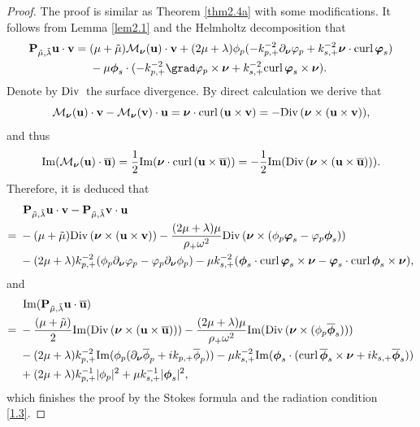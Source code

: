 \documentclass[final,reqno]{siamltex}
\newcommand{\Div}{{\rm Div\,}}
\newcommand{\om}{\omega}
\newcommand{\pa}{\partial}
\newcommand{\ov}{\overline}
\newcommand{\I}{{\rm Im}}
\newcommand{\curl}{{\rm curl\,}}
\newcommand{\ben}{\begin{eqnarray*}}
\newcommand{\enn}{\end{eqnarray*}}
\begin{document}
\begin{proof}
	The proof is similar as Theorem \ref{thm2.4a} with some modifications. It follows from Lemma \ref{lem2.1} and the Helmholtz decomposition that 
	\begin{align*}
	  \begin{aligned}
	  	\mathbf{P}_{\tilde{\mu},\tilde{\lambda}}\mathbf{u}\cdot\mathbf{v}=\;&(\mu+\tilde{\mu})\mathcal{M}_{\boldsymbol{\nu}}(\mathbf{u})\cdot\mathbf{v}+(2\mu+\lambda)\phi_p(-k_{p,+}^{-2}\pa_{\boldsymbol{\nu}}\varphi_p+k_{s,+}^{-2}\boldsymbol{\nu}\cdot\curl\boldsymbol{\varphi}_s) \\
	  &-\mu\boldsymbol{\phi}_s\cdot(-k_{p,+}^{-2}\grad\varphi_p\times\boldsymbol{\nu}+k_{s,+}^{-2}\curl\boldsymbol{\varphi}_s\times\boldsymbol{\nu}). 
	  \end{aligned}
	\end{align*}
	Denote by $\Div$ the surface divergence. By direct calculation we derive that 
	$$
	  \mathcal{M}_{\boldsymbol{\nu}}(\mathbf{u})\cdot\mathbf{v}-\mathcal{M}_{\boldsymbol{\nu}}(\mathbf{v})\cdot\mathbf{u}=\boldsymbol{\nu}\cdot\curl(\mathbf{u}\times\mathbf{v})=-\Div(\boldsymbol{\nu}\times(\mathbf{u}\times\mathbf{v})), 
	$$
	and thus 
	$$
	  \I(\mathcal{M}_{\boldsymbol{\nu}}(\mathbf{u})\cdot\mathbf{\ov u})=\frac{1}{2}\I(\boldsymbol{\nu}\cdot\curl(\mathbf{u}\times\mathbf{\ov u}))=-\frac{1}{2}\I(\Div(\boldsymbol{\nu}\times(\mathbf{u}\times\mathbf{\ov u}))). 
	$$
	Therefore, it is deduced that 
	\ben
	  \begin{aligned}
	  	&\;\mathbf{P}_{\tilde{\mu},\tilde{\lambda}}\mathbf{u}\cdot\mathbf{v}-\mathbf{P}_{\tilde{\mu},\tilde{\lambda}}\mathbf{v}\cdot\mathbf{u} \\
	  =\;&-(\mu+\tilde{\mu})\Div(\boldsymbol{\nu}\times(\mathbf{u}\times\mathbf{v}))-\frac{(2\mu+\lambda)\mu}{\rho_+\om^2}\Div(\boldsymbol{\nu}\times(\phi_p\boldsymbol{\varphi}_s-\varphi_p\boldsymbol{\phi}_s)) \\
	  &-(2\mu+\lambda)k_{p,+}^{-2}(\phi_p\pa_{\boldsymbol{\nu}}\varphi_p-\varphi_p\pa_{\boldsymbol{\nu}}\phi_p)-\mu k_{s,+}^{-2}(\boldsymbol{\phi}_s\cdot\curl\boldsymbol{\varphi}_s\times\boldsymbol{\nu}-\boldsymbol{\varphi}_s\cdot\curl\boldsymbol{\phi}_s\times\boldsymbol{\nu}), 
	  \end{aligned}
	\enn
	and 
	\ben
	  \begin{aligned}
	  	&\;\I(\mathbf{P}_{\tilde{\mu},\tilde{\lambda}}\mathbf{u}\cdot\mathbf{\ov u}) \\
	  =\;&-\frac{(\mu+\tilde{\mu})}{2}\I(\Div(\boldsymbol{\nu}\times(\mathbf{u}\times\mathbf{\ov u})))-\frac{(2\mu+\lambda)\mu}{\rho_+\om^2}\I(\Div(\boldsymbol{\nu}\times(\phi_p\boldsymbol{\ov\phi}_s))) \\
	  &-(2\mu+\lambda)k_{p,+}^{-2}\I(\phi_p(\pa_{\boldsymbol{\nu}}\ov\phi_p+ik_{p,+}\ov\phi_p))-\mu k_{s,+}^{-2}\I(\boldsymbol{\phi}_s\cdot(\curl\boldsymbol{\ov\phi}_s\times\boldsymbol{\nu}+ik_{s,+}\boldsymbol{\ov\phi}_s)) \\
	  &+(2\mu+\lambda)k_{p,+}^{-1}|\phi_p|^2+\mu k_{s,+}^{-1}|\boldsymbol{\phi}_s|^2, 
	  \end{aligned}
	\enn
	which finishes the proof by the Stokes formula and the radiation condition \eqref{1.3}. 
\end{proof}
\end{document}
